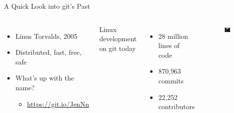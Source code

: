 \documentclass{beamer}
\begin{document}
    \begin{frame}{A Quick Look into git's Past}
        \begin{columns}
            \begin{itemize}
                \item Linus Torvalds, 2005
                \item Distributed, fast, free, safe
                \item What's up with the name?
                \begin{itemize}
                    \item \url{https://git.io/JenNn}
                \end{itemize}
            \end{itemize}

            Linux development on git today
            \begin{itemize}
                \item 28 million lines of code
                \item 870,963 commits
                \item 22,252 contributors
            \end{itemize}

            \begin{figure}
                \centering
                \includegraphics[width=\textwidth]{figures/linus.jpg}
            \end{figure}
        \end{columns}
    \end{frame}
\end{document}
